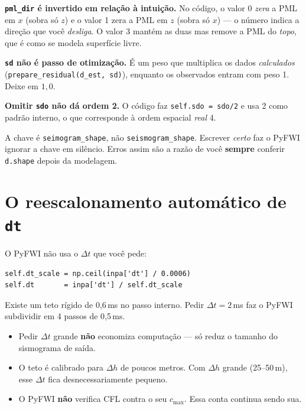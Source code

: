 \documentclass[11pt,a4paper,oneside]{report}
\begin{document}
\begin{armadilha}
\textbf{\texttt{pml\_dir} é invertido em relação à intuição.} No código, o
valor 0 \emph{zera} a PML em $x$ (sobra só $z$) e o valor 1 zera a PML em $z$
(sobra só $x$) --- o número indica a direção que você \emph{desliga}. O valor 3
mantém as duas mas remove a PML do \emph{topo}, que é como se modela superfície
livre.

\textbf{\texttt{sd} não é passo de otimização.} É um peso que multiplica os
dados \emph{calculados} (\texttt{prepare\_residual(d\_est, sd)}), enquanto os
observados entram com peso 1. Deixe em $1{,}0$.

\textbf{Omitir \texttt{sdo} não dá ordem 2.} O código faz
\texttt{self.sdo = sdo/2} e usa 2 como padrão interno, o que corresponde à
ordem espacial \emph{real} 4.
\end{armadilha}

\begin{armadilha}
A chave é \texttt{seimogram\_shape}, não \texttt{seismogram\_shape}. Escrever
\emph{certo} faz o PyFWI ignorar a chave em silêncio. Erros assim são a razão
de você \textbf{sempre} conferir \texttt{d.shape} depois da modelagem.
\end{armadilha}

\section{O reescalonamento automático de \texttt{dt}}

O PyFWI não usa o $\Delta t$ que você pede:
\begin{lstlisting}
self.dt_scale = np.ceil(inpa['dt'] / 0.0006)
self.dt       = inpa['dt'] / self.dt_scale
\end{lstlisting}

Existe um teto rígido de 0{,}6\,ms no passo interno. Pedir
$\Delta t = 2$\,ms faz o PyFWI subdividir em 4 passos de 0{,}5\,ms.

\begin{pratica}
\begin{itemize}[leftmargin=*]
\item Pedir $\Delta t$ grande \textbf{não} economiza computação --- só reduz o
tamanho do sismograma de saída.
\item O teto é calibrado para $\Delta h$ de poucos metros. Com $\Delta h$
grande (25--50\,m), esse $\Delta t$ fica desnecessariamente pequeno.
\item O PyFWI \textbf{não} verifica CFL contra o seu $c_{\max}$. Essa conta
continua sendo sua.
\end{itemize}
\end{pratica}
\end{document}

